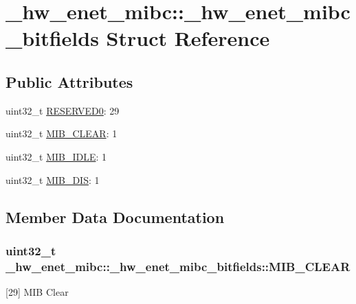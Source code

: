 \hypertarget{struct__hw__enet__mibc_1_1__hw__enet__mibc__bitfields}{}\section{\+\_\+hw\+\_\+enet\+\_\+mibc\+:\+:\+\_\+hw\+\_\+enet\+\_\+mibc\+\_\+bitfields Struct Reference}
\label{struct__hw__enet__mibc_1_1__hw__enet__mibc__bitfields}
\subsection*{Public Attributes}
\begin{DoxyCompactItemize}
\item 
uint32\+\_\+t \hyperlink{struct__hw__enet__mibc_1_1__hw__enet__mibc__bitfields_acad8accea2ffbfb0429248776514e657}{R\+E\+S\+E\+R\+V\+E\+D0}\+: 29
\item 
uint32\+\_\+t \hyperlink{struct__hw__enet__mibc_1_1__hw__enet__mibc__bitfields_adb82c324ecc207e05f7936c5b9dc27d8}{M\+I\+B\+\_\+\+C\+L\+E\+AR}\+: 1
\item 
uint32\+\_\+t \hyperlink{struct__hw__enet__mibc_1_1__hw__enet__mibc__bitfields_af661a210fc6b9cbf81be5a29db0580eb}{M\+I\+B\+\_\+\+I\+D\+LE}\+: 1
\item 
uint32\+\_\+t \hyperlink{struct__hw__enet__mibc_1_1__hw__enet__mibc__bitfields_a934c4c78490b6a9c7f9d5f6893407a18}{M\+I\+B\+\_\+\+D\+IS}\+: 1
\end{DoxyCompactItemize}


\subsection{Member Data Documentation}
\subsubsection[{\texorpdfstring{M\+I\+B\+\_\+\+C\+L\+E\+AR}{MIB_CLEAR}}]{\setlength{\rightskip}{0pt plus 5cm}uint32\+\_\+t \+\_\+hw\+\_\+enet\+\_\+mibc\+::\+\_\+hw\+\_\+enet\+\_\+mibc\+\_\+bitfields\+::\+M\+I\+B\+\_\+\+C\+L\+E\+AR}\hypertarget{struct__hw__enet__mibc_1_1__hw__enet__mibc__bitfields_adb82c324ecc207e05f7936c5b9dc27d8}{}\label{struct__hw__enet__mibc_1_1__hw__enet__mibc__bitfields_adb82c324ecc207e05f7936c5b9dc27d8}
\mbox{[}29\mbox{]} M\+IB Clear 
